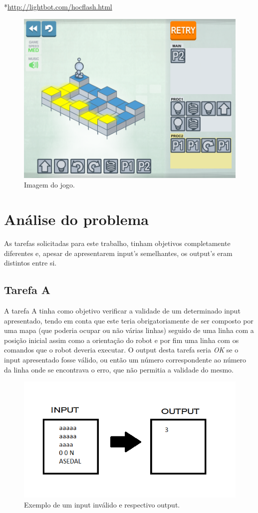 \documentclass[a4paper,12pt]{report}
\begin{document}
*\url{http://lightbot.com/hocflash.html}
\begin{figure}[!h]
\centering
\includegraphics[scale=0.33]{./lightbot.png}
\caption{Imagem do jogo.}
\end{figure}

\chapter{Análise do problema} 
As tarefas solicitadas para este trabalho, tinham objetivos completamente diferentes e, apesar de apresentarem input’s semelhantes, os output’s eram distintos entre si.

\section{Tarefa A}
A tarefa A tinha como objetivo verificar a validade de um determinado input apresentado, tendo em conta que este teria obrigatoriamente de ser composto por uma mapa (que poderia ocupar ou não várias linhas) seguido de uma linha com a posição inicial assim como a orientação do robot e por fim uma linha com os comandos que o robot deveria executar. O output desta tarefa seria \emph{OK} se o input apresentado fosse válido, ou então um número correspondente ao número da linha onde se encontrava o erro, que não permitia a validade do mesmo.
\begin{figure}[!h]
\centering
\includegraphics[scale=0.45]{./RELATORIOEX1.png}
\caption{Exemplo de um input inválido e respectivo output.}
\end{figure}
\end{document}

